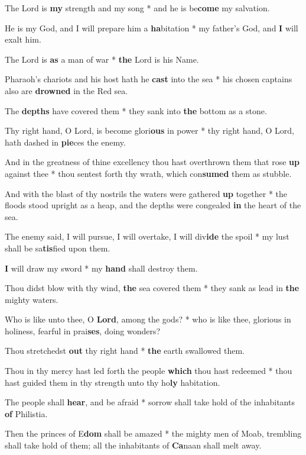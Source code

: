 \begin{multicols}{2}
	The Lord is \textbf{my} strength and my song * and he is be\textbf{come} my salvation.
	
	He is my God, and I will prepare him a \textbf{ha}bitation * my father's God, and \textbf{I} will exalt him.
	
	The Lord is \textbf{as} a man of war * \textbf{the} Lord is his Name.
	
	Pharaoh's chariots and his host hath he \textbf{cast} into the sea * his chosen captains also are \textbf{drowned} in the Red sea.
	
	The \textbf{depths} have covered them * they sank into \textbf{the} bottom as a stone.
	
	Thy right hand, O Lord, is become glori\textbf{ous} in power * thy right hand, O Lord, hath dashed in \textbf{pie}ces the enemy.
	
	And in the greatness of thine excellency thou hast overthrown them that rose \textbf{up} against thee * thou sentest forth thy wrath, which con\textbf{sumed} them as stubble.
	
	And with the blast of thy nostrils the waters were gathered \textbf{up} together * the floods stood upright as a heap, and the depths were congealed \textbf{in} the heart of the sea.
	
	The enemy said, I will pursue, I will overtake, I will div\textbf{ide} the spoil * my lust shall be sa\textbf{tis}fied upon them.
	
	\textbf{I} will draw my sword * my \textbf{hand} shall destroy them.
	
	Thou didst blow with thy wind, \textbf{the} sea covered them * they sank as lead in \textbf{the} mighty waters.
	
	Who is like unto thee, O \textbf{Lord}, among the gods? * who is like thee, glorious in holiness, fearful in prai\textbf{ses}, doing wonders?
	
	Thou stretchedst \textbf{out} thy right hand * \textbf{the} earth swallowed them.
	
	Thou in thy mercy hast led forth the people \textbf{which} thou hast redeemed * thou hast guided them in thy strength unto thy ho\textbf{ly} habitation.
	
	The people shall \textbf{hear}, and be afraid * sorrow shall take hold of the inhabitants \textbf{of} Philistia.
	
	Then the princes of E\textbf{dom} shall be amazed * the mighty men of Moab, trembling shall take hold of them; all the inhabitants of \textbf{Ca}naan shall melt away.
	

\end{multicols}
